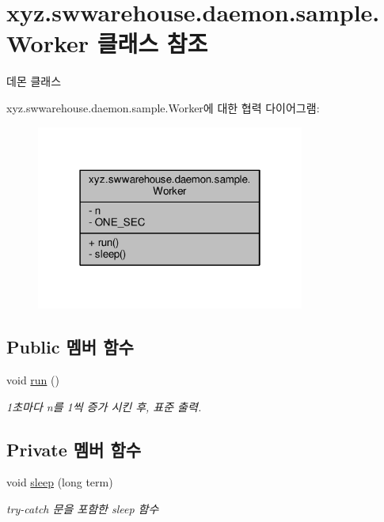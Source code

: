 \hypertarget{classxyz_1_1swwarehouse_1_1daemon_1_1sample_1_1_worker}{\section{xyz.\-swwarehouse.\-daemon.\-sample.\-Worker 클래스 참조}
\label{classxyz_1_1swwarehouse_1_1daemon_1_1sample_1_1_worker}
}


데몬 클래스  




xyz.\-swwarehouse.\-daemon.\-sample.\-Worker에 대한 협력 다이어그램\-:\nopagebreak
\begin{figure}[H]
\begin{center}
\leavevmode
\includegraphics[width=250pt]{classxyz_1_1swwarehouse_1_1daemon_1_1sample_1_1_worker__coll__graph}
\end{center}
\end{figure}
\subsection*{Public 멤버 함수}
\begin{DoxyCompactItemize}
\item 
void \hyperlink{classxyz_1_1swwarehouse_1_1daemon_1_1sample_1_1_worker_af1bf199e3277a2946e59c7acc5416731}{run} ()
\begin{DoxyCompactList}\small\item\em 1초마다 n를 1씩 증가 시킨 후, 표준 출력. \end{DoxyCompactList}\end{DoxyCompactItemize}
\subsection*{Private 멤버 함수}
\begin{DoxyCompactItemize}
\item 
void \hyperlink{classxyz_1_1swwarehouse_1_1daemon_1_1sample_1_1_worker_ae9991783aa9ada529a18ecb5abdb4ad7}{sleep} (long term)
\begin{DoxyCompactList}\small\item\em try-\/catch 문을 포함한 sleep 함수 \end{DoxyCompactList}\end{DoxyCompactItemize}
